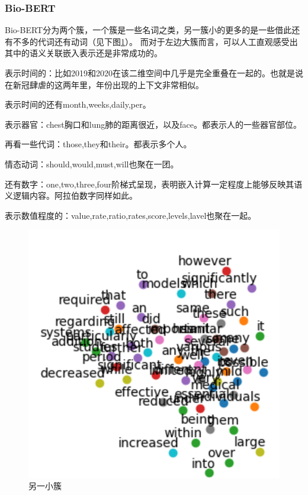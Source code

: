 \documentclass[12pt]{article}
\begin{document}
\subsubsection{Bio-BERT}
Bio-BERT分为两个簇，一个簇是一些名词之类，另一簇小的更多的是一些借此还有不多的代词还有动词（见下图\ref{sssa}）。
而对于左边大簇而言，可以人工直观感受出其中的语义关联嵌入表示还是非常成功的。\par
表示时间的：比如2019和2020在该二维空间中几乎是完全重叠在一起的。也就是说在新冠肆虐的这两年里，年份出现的上下文非常相似。\par
表示时间的还有month,weeks,daily,per。\par
表示器官：chest胸口和lung肺的距离很近，以及face。都表示人的一些器官部位。\par
再看一些代词：those,they和their。都表示多个人。\par
情态动词：should,would,must,will也聚在一团。\par
还有数字：one,two,three,four阶梯式呈现，表明嵌入计算一定程度上能够反映其语义逻辑内容。阿拉伯数字同样如此。\par
表示数值程度的：value,rate,ratio,rates,score,levels,lavel也聚在一起。
\begin{figure}[H]
  \centering
  \includegraphics[scale=0.3]{./picture/另一小簇.png} %
  \caption{另一小簇} %
  \label{sssa} %
\end{figure}
\end{document}
